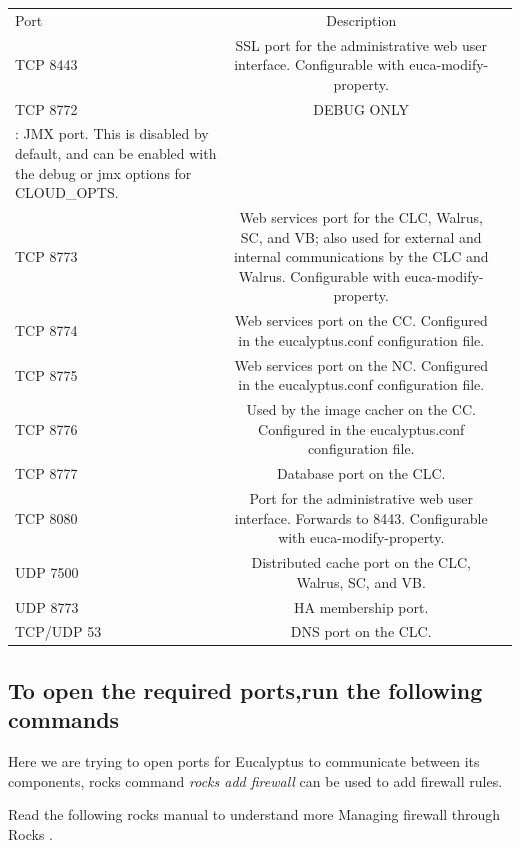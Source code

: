 \begin{center}
\begin{tabular}{ | l | c | r |}
    \hline
Port&Description \\
TCP 8443& SSL port for the administrative web user interface. Configurable with euca-modify-property.\\
TCP 8772&DEBUG ONLY\\: JMX port. This is disabled by default, and can be enabled with the \-\-debug or \-\-jmx options for CLOUD\_OPTS. \\
TCP 8773&Web services port for the CLC, Walrus, SC, and VB; also used for external and internal communications by the CLC and Walrus. Configurable with euca-modify-property.\\
TCP 8774&Web services port on the CC. Configured in the eucalyptus.conf configuration file.\\
TCP 8775&Web services port on the NC. Configured in the eucalyptus.conf configuration file.\\
TCP 8776&Used by the image cacher on the CC. Configured in the eucalyptus.conf configuration file.\\
TCP 8777&Database port on the CLC.\\
TCP 8080&Port for the administrative web user interface. Forwards to 8443. Configurable with euca-modify-property.\\
UDP 7500&Distributed cache port on the CLC, Walrus, SC, and VB.\\
UDP 8773&HA membership port.\\
TCP/UDP 53&DNS port on the CLC.\\
\end{tabular}
\end{center}

\subsection{To open the required ports,run the following commands}
Here we are trying to open ports for Eucalyptus to communicate between its components, rocks command \emph{rocks add firewall} can be used to add firewall rules. 

Read the following rocks manual to understand more Managing firewall through Rocks \cite{mfirewal}.

